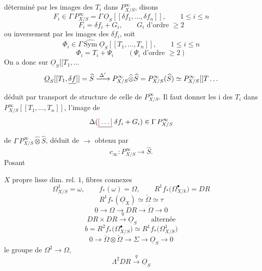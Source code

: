 \documentclass[11pt,a4paper]{article}
\begin{document}
déterminé par les images des $T_i$ dans $P^{\infty}_{X/S}$, disons
\[
  F_i \in \Gamma\, P^{\infty}_{X/S}
  = \Gamma\, \underline{O}_S[[\delta f_1, \ldots, \delta f_n]],
  \qquad 1 \leqslant i \leqslant n
\]
\[
  F_i = \delta f_i + G_i, \qquad G_i \text{ d'ordre } \geqslant 2
\]
ou inversement par les images des $\delta f_i$, soit
\[
  \Phi_i \in \Gamma\, \widehat{\mathrm{Sym}}\;
  \underline{O}_S[[T_1, \ldots, T_n]],
  \qquad 1 \leqslant i \leqslant n
\]
\[
  \Phi_i = T_i + \Psi_i \qquad (\Psi_i \text{ d'ordre } \geqslant 2)
\]
On a donc  \ill{} sur $\underline{O}_S[[T_1, \ldots$
\[
  \underline{O}_S[[T_1, \struck{\delta f}]] = \widehat{S}
  \xrightarrow{\;\Delta'\;} P^{\infty}_{X/S} \widehat{\otimes} \widehat{S}
  = P^{\infty}_{X/S}(\widehat{S}) \simeq P^{\infty}_{X/S}[[T \ldots
\]
déduit par transport de structure de celle de $P^{\infty}_{X/S}$. Il faut
donner les i\ill{} des $T_i$ dans $P^{\infty}_{X/S}[[T_1, \ldots, T_n]]$,
\ill{} l'image de
\[
  \Delta(\struck{\ill{}}\; \delta f_i + G_i) \in \Gamma\, P^{\infty}_{X/S}
\]
de $\Gamma\, P^{\infty}_{X/S} \widehat{\otimes} \widehat{S}$, déduit de
$\longrightarrow$ obtenu par \ill{}
\[
  c_{\infty} : P^{\infty}_{X/S} \longrightarrow \widehat{S}.
\]
Posant


$X$ propre lisse dim. rel. $1$, fibres connexes
\[
  \Omega^1_{X/S} = \omega, \qquad f_*(\omega) = \Omega, \qquad
  R^1 f_*\big( \Omega^{\bullet}_{X/k} \big) = DR
\]
\[
  R^1 f_*(\underline{O}_X) \simeq \check{\Omega} \simeq \tau
\]
\[
  0 \longrightarrow \Omega \longrightarrow DR \longrightarrow
  \check{\Omega} \longrightarrow 0
\]
\struck{\ill{}}
\[
  DR \times DR \xrightarrow{\;q\;} \underline{O}_S \qquad \text{alternée}
\]
\[
  b = R^2 f_*\big( \Omega^{\bullet}_{X/S} \big)
  \simeq R^1 f_*\big( \Omega^1_{X/S} \big)
\]
\[
  0 \longrightarrow \check{\Omega} \otimes \check{\Omega} \longrightarrow
  \Sigma \longrightarrow \underline{O}_S \longrightarrow 0
\]
\ill{} le groupe de $\Omega^2 \to \Omega$, \struck{$\Omega \otimes
\check{\Omega}$}
\[
  \Lambda^2 DR \xrightarrow{\;q\;} \underline{O}_S
\]

\end{document}
